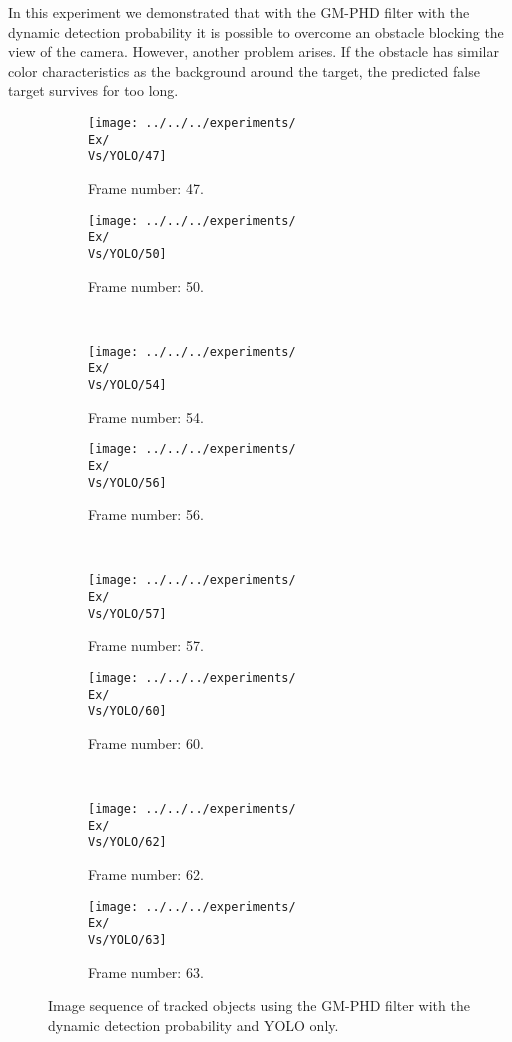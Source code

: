 In this experiment we demonstrated that with the GM-PHD filter with the dynamic detection probability it is possible to overcome an obstacle blocking the view of the camera. However, another problem arises. If the obstacle has similar color characteristics as the background around the target, the predicted false target survives for too long.
\begin{figure}[H]
    \centering
    \begin{subfigure}{0.48\textwidth}
        \centering
        \texttt{[image: ../../../experiments/\\Ex/\\Vs/YOLO/47]}
        \caption{Frame number: 47.}
        \label{fig:\Ex-\Vs-\Set:01}
    \end{subfigure}
    \begin{subfigure}{0.48\textwidth}
        \centering
        \texttt{[image: ../../../experiments/\\Ex/\\Vs/YOLO/50]}
        \caption{Frame number: 50.}
        \label{fig:\Ex-\Vs-\Set:02}
    \end{subfigure}
    \\
    \begin{subfigure}{0.48\textwidth}
        \centering
        \texttt{[image: ../../../experiments/\\Ex/\\Vs/YOLO/54]}
        \caption{Frame number: 54.}
        \label{fig:\Ex-\Vs-\Set:03}
    \end{subfigure}
    \begin{subfigure}{0.48\textwidth}
        \centering
        \texttt{[image: ../../../experiments/\\Ex/\\Vs/YOLO/56]}
        \caption{Frame number: 56.}
        \label{fig:\Ex-\Vs-\Set:04}
    \end{subfigure}
    \\
    \begin{subfigure}{0.48\textwidth}
        \centering
        \texttt{[image: ../../../experiments/\\Ex/\\Vs/YOLO/57]}
        \caption{Frame number: 57.}
        \label{fig:\Ex-\Vs-\Set:05}
    \end{subfigure}
    \begin{subfigure}{0.48\textwidth}
        \centering
        \texttt{[image: ../../../experiments/\\Ex/\\Vs/YOLO/60]}
        \caption{Frame number: 60.}
        \label{fig:\Ex-\Vs-\Set:06}
    \end{subfigure}
    \\
    \begin{subfigure}{0.48\textwidth}
        \centering
        \texttt{[image: ../../../experiments/\\Ex/\\Vs/YOLO/62]}
        \caption{Frame number: 62.}
        \label{fig:\Ex-\Vs-\Set:07}
    \end{subfigure}
    \begin{subfigure}{0.48\textwidth}
        \centering
        \texttt{[image: ../../../experiments/\\Ex/\\Vs/YOLO/63]}
        \caption{Frame number: 63.}
        \label{fig:\Ex-\Vs-\Set:08}
    \end{subfigure}
    \caption{Image sequence of tracked objects using the GM-PHD filter with the dynamic detection probability and YOLO only.}
    \label{fig:\Ex-\Vs-\Set}
\end{figure}

